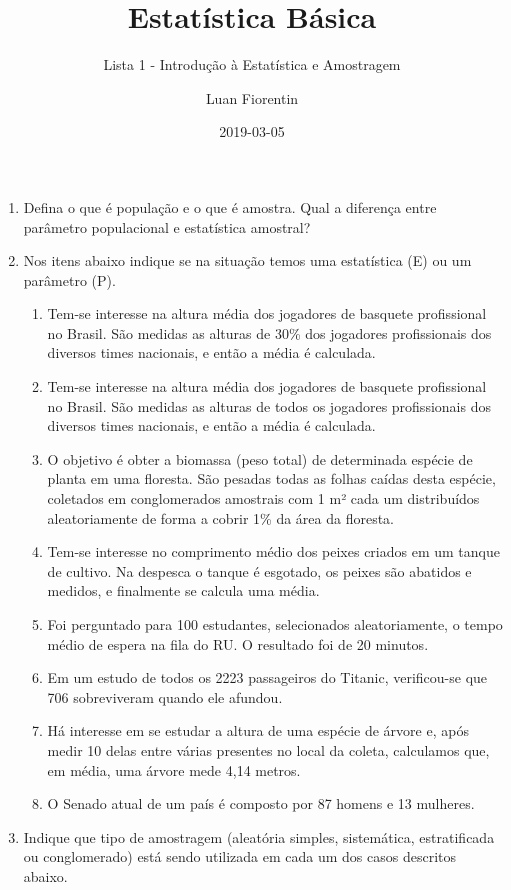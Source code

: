 \documentclass[]{article}
\title{Estatística Básica}
\subtitle{Lista 1 - Introdução à Estatística e Amostragem}
\author{Luan Fiorentin}
\date{2019-03-05}
\providecommand{\tightlist}{%
  \setlength{\itemsep}{0pt}\setlength{\parskip}{0pt}}
\begin{document}
\maketitle

\begin{enumerate}
\def\labelenumi{\arabic{enumi}.}
\item
  Defina o que é população e o que é amostra. Qual a diferença entre
  parâmetro populacional e estatística amostral?
\item
  Nos itens abaixo indique se na situação temos uma estatística (E) ou
  um parâmetro (P).

  \begin{enumerate}
  \def\labelenumii{(\alph{enumii})}
  \tightlist
  \item
    Tem-se interesse na altura média dos jogadores de basquete
    profissional no Brasil. São medidas as alturas de 30\% dos jogadores
    profissionais dos diversos times nacionais, e então a média é
    calculada.
  \item
    Tem-se interesse na altura média dos jogadores de basquete
    profissional no Brasil. São medidas as alturas de todos os jogadores
    profissionais dos diversos times nacionais, e então a média é
    calculada.
  \item
    O objetivo é obter a biomassa (peso total) de determinada espécie de
    planta em uma floresta. São pesadas todas as folhas caídas desta
    espécie, coletados em conglomerados amostrais com 1 m² cada um
    distribuídos aleatoriamente de forma a cobrir 1\% da área da
    floresta.
  \item
    Tem-se interesse no comprimento médio dos peixes criados em um
    tanque de cultivo. Na despesca o tanque é esgotado, os peixes são
    abatidos e medidos, e finalmente se calcula uma média.
  \item
    Foi perguntado para 100 estudantes, selecionados aleatoriamente, o
    tempo médio de espera na fila do RU. O resultado foi de 20 minutos.
  \item
    Em um estudo de todos os 2223 passageiros do Titanic, verificou-se
    que 706 sobreviveram quando ele afundou.
  \item
    Há interesse em se estudar a altura de uma espécie de árvore e, após
    medir 10 delas entre várias presentes no local da coleta, calculamos
    que, em média, uma árvore mede 4,14 metros.
  \item
    O Senado atual de um país é composto por 87 homens e 13 mulheres.
  \end{enumerate}
\item
  Indique que tipo de amostragem (aleatória simples, sistemática,
  estratificada ou conglomerado) está sendo utilizada em cada um dos
  casos descritos abaixo.


\end{enumerate}
\end{document}
